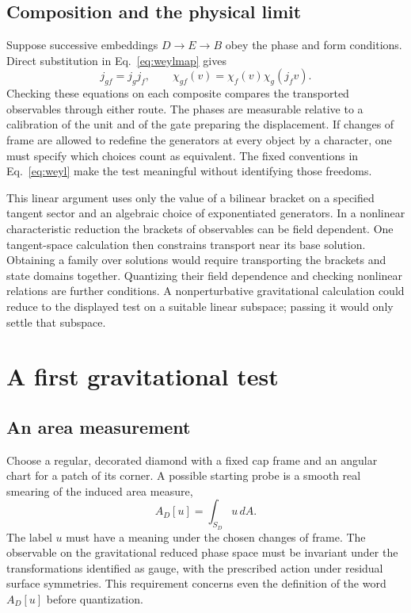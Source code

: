 \documentclass[11pt,letterpaper]{article}
\begin{document}
\subsection{Composition and the physical limit}

Suppose successive embeddings $D\to E\to B$ obey the phase and form conditions. Direct substitution in Eq.~\eqref{eq:weylmap} gives
\[
 j_{gf}=j_gj_f,\qquad
 \chi_{gf}(v)=\chi_f(v)\chi_g(j_fv).
\]
Checking these equations on each composite compares the transported observables through either route. The phases are measurable relative to a calibration of the unit and of the gate preparing the displacement. If changes of frame are allowed to redefine the generators at every object by a character, one must specify which choices count as equivalent. The fixed conventions in Eq.~\eqref{eq:weyl} make the test meaningful without identifying those freedoms.

This linear argument uses only the value of a bilinear bracket on a specified tangent sector and an algebraic choice of exponentiated generators. In a nonlinear characteristic reduction the brackets of observables can be field dependent. One tangent-space calculation then constrains transport near its base solution. Obtaining a family over solutions would require transporting the brackets and state domains together. Quantizing their field dependence and checking nonlinear relations are further conditions. A nonperturbative gravitational calculation could reduce to the displayed test on a suitable linear subspace; passing it would only settle that subspace.

\section{A first gravitational test}

\subsection{An area measurement}

Choose a regular, decorated diamond with a fixed cap frame and an angular chart for a patch of its corner. A possible starting probe is a smooth real smearing of the induced area measure,
\[
 A_D[u]=\int_{S_D}u\,dA .
\]
The label $u$ must have a meaning under the chosen changes of frame. The observable on the gravitational reduced phase space must be invariant under the transformations identified as gauge, with the prescribed action under residual surface symmetries. This requirement concerns even the definition of the word $A_D[u]$ before quantization.
\end{document}
